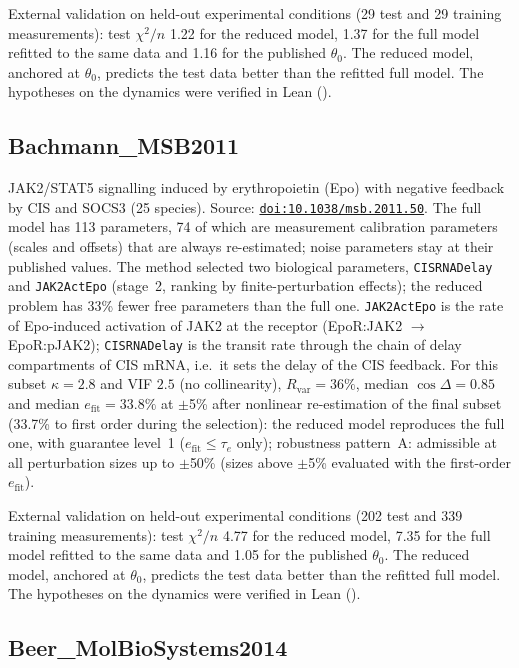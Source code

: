 External validation on held-out experimental conditions (29 test and 29 training measurements): test $\chi^2/n$ 1.22 for the reduced model, 1.37 for the full model refitted to the same data and 1.16 for the published $\theta_0$. The reduced model, anchored at $\theta_0$, predicts the test data better than the refitted full model. The hypotheses on the dynamics were verified in Lean ().

\subsection*{Bachmann\_MSB2011}

JAK2/STAT5 signalling induced by erythropoietin (Epo) with negative feedback by CIS and SOCS3 (25 species). Source: \href{https://doi.org/10.1038/msb.2011.50}{\nolinkurl{doi:10.1038/msb.2011.50}}. The full model has 113 parameters, 74 of which are measurement calibration parameters (scales and offsets) that are always re-estimated; noise parameters stay at their published values. The method selected two biological parameters, \texttt{CISRNADelay} and \texttt{JAK2ActEpo} (stage~2, ranking by finite-perturbation effects); the reduced problem has 33\% fewer free parameters than the full one. \texttt{JAK2ActEpo} is the rate of Epo-induced activation of JAK2 at the receptor (EpoR:JAK2 $\to$ EpoR:pJAK2); \texttt{CISRNADelay} is the transit rate through the chain of delay compartments of CIS mRNA, i.e.\ it sets the delay of the CIS feedback. For this subset $\kappa=2.8$ and VIF $2.5$ (no collinearity), $R_{\mathrm{var}}=36\%$, median $\cos\Delta=0.85$ and median $e_{\mathrm{fit}}=33.8\%$ at $\pm$5\% after nonlinear re-estimation of the final subset (33.7\% to first order during the selection): the reduced model reproduces the full one, with guarantee level~1 ($e_{\mathrm{fit}}\le\tau_e$ only); robustness pattern~A: admissible at all perturbation sizes up to $\pm$50\% (sizes above $\pm$5\% evaluated with the first-order $e_{\mathrm{fit}}$).

External validation on held-out experimental conditions (202 test and 339 training measurements): test $\chi^2/n$ 4.77 for the reduced model, 7.35 for the full model refitted to the same data and 1.05 for the published $\theta_0$. The reduced model, anchored at $\theta_0$, predicts the test data better than the refitted full model. The hypotheses on the dynamics were verified in Lean ().

\subsection*{Beer\_MolBioSystems2014}

